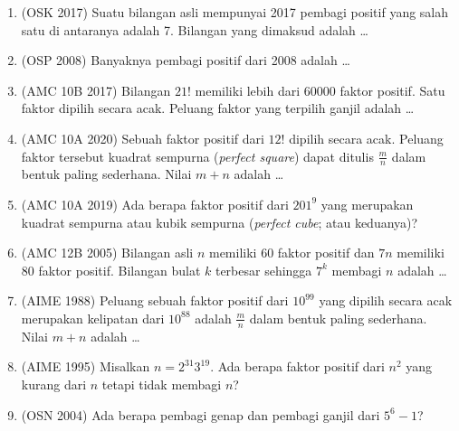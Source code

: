 \documentclass[12pt]{scrartcl}
\begin{document}
\begin{enumerate}
	\item (OSK 2017)
	Suatu bilangan asli mempunyai 2017 pembagi positif yang salah satu
	di antaranya adalah 7. Bilangan yang dimaksud adalah \dots

	\item (OSP 2008)
	Banyaknya pembagi positif dari 2008 adalah \dots

	\item (AMC 10B 2017)
	Bilangan $21!$ memiliki lebih dari $60000$ faktor positif.
	Satu faktor dipilih secara acak.
	Peluang faktor yang terpilih ganjil adalah \dots

	\item (AMC 10A 2020)
	Sebuah faktor positif dari $12!$ dipilih secara acak.
	Peluang faktor tersebut kuadrat sempurna (\textit{perfect square}) dapat ditulis $\frac{m}{n}$
	dalam bentuk paling sederhana. Nilai $m + n$ adalah \dots

	\item (AMC 10A 2019)
	Ada berapa faktor positif dari $201^{9}$ yang merupakan kuadrat sempurna
	atau kubik sempurna (\textit{perfect cube}; atau keduanya)?

	\item (AMC 12B 2005)
	Bilangan asli $n$ memiliki $60$ faktor positif dan $7n$ memiliki
	$80$ faktor positif. Bilangan bulat $k$ terbesar sehingga $7^{k}$
	membagi $n$ adalah \dots

	\item (AIME 1988)
	Peluang sebuah faktor positif dari $10^{99}$ yang dipilih secara acak
	merupakan kelipatan dari $10^{88}$ adalah $\frac{m}{n}$ dalam bentuk
	paling sederhana. Nilai $m + n$ adalah \dots

	\item (AIME 1995)
	Misalkan $n = 2^{31}3^{19}$. Ada berapa faktor positif dari $n^2$
	yang kurang dari $n$ tetapi tidak membagi $n$?

	\item (OSN 2004)
	Ada berapa pembagi genap dan pembagi ganjil dari $5^{6} - 1$?


\end{enumerate}
\end{document}
